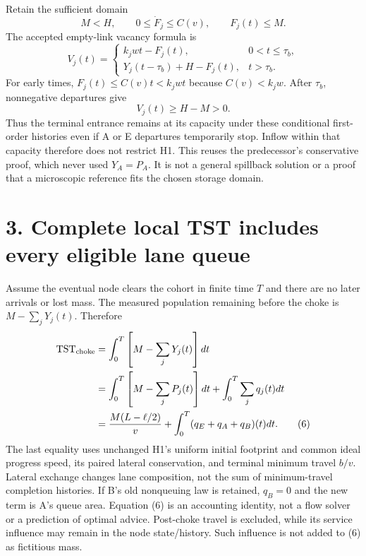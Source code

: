 \documentclass[11pt,a4paper]{article}
\begin{document}
Retain the sufficient domain
\begin{equation}
 M<H,\qquad 0\leq\dot F_j\leq C(v),\qquad F_j(t)\leq M.
 \tag{3}
\end{equation}
The accepted empty-link vacancy formula is
\begin{equation}
 V_j(t)=
 \begin{cases}
 k_jwt-F_j(t),&0<t\leq\tau_b,\\
 Y_j(t-\tau_b)+H-F_j(t),&t>\tau_b.
 \end{cases}
 \tag{4}
\end{equation}
For early times, $F_j(t)\leq C(v)t<k_jwt$ because $C(v)<k_jw$.
After $\tau_b$, nonnegative departures give
\begin{equation}
 V_j(t)\geq H-M>0.
 \tag{5}
\end{equation}
Thus the terminal entrance remains at its capacity under these conditional
first-order histories even if A or E departures temporarily stop. Inflow
within that capacity therefore does not restrict H1. This reuses the
predecessor's conservative proof, which never used $Y_A=P_A$.
It is not a general spillback solution or a proof that a microscopic
reference fits the chosen storage domain.

\newpage
\section*{3. Complete local TST includes every eligible lane queue}

Assume the eventual node clears the cohort in finite time $T$ and there are
no later arrivals or lost mass. The measured population remaining before
the choke is $M-\sum_jY_j(t)$. Therefore
\begin{align}
 \mathrm{TST}_{\rm choke}
 &=\int_0^T\left[M-\sum_jY_j(t)\right]dt\\
 &=\int_0^T\left[M-\sum_jP_j(t)\right]dt
   +\int_0^T\sum_jq_j(t)dt\\
 &=\frac{M(L-\ell/2)}{v}
   +\int_0^T(q_E+q_A+q_B)(t)dt.
 \tag{6}
\end{align}
The last equality uses unchanged H1's uniform initial footprint and common
ideal progress speed, its paired lateral conservation, and terminal
minimum travel $b/v$. Lateral exchange changes lane composition, not the
sum of minimum-travel completion histories. If B's old nonqueuing law is
retained, $q_B=0$ and the new term is A's queue area. Equation (6) is an
accounting identity, not a flow solver or a prediction of optimal advice.
Post-choke travel is excluded, while its service influence may remain in
the node state/history. Such influence is not added to (6) as fictitious mass.
\end{document}
